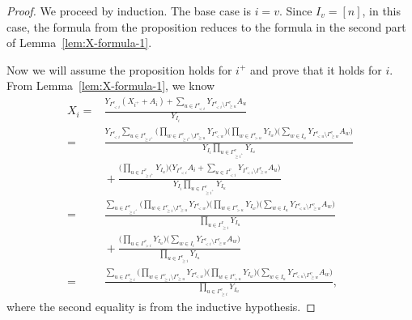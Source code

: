 \documentclass[pdftex]{sigma}
\numberwithin{equation}{section}
\begin{document}
\begin{proof}
We proceed by induction. The base case is $i=v$. Since $I_v=[n]$, in this case, the formula from the proposition reduces to the formula in the second part of Lemma~\ref{lem:X-formula-1}.

Now we will assume the proposition holds for $i^+$ and prove that it holds for $i$. From Lemma~\ref{lem:X-formula-1}, we know
\begin{align*}
X_i={} & \frac{Y_{\Gamma_{< i}^v}(X_{i^+}+A_i)+\sum_{u\in \Gamma_{< i}^v}Y_{\Gamma_{< i}^v\setminus\Gamma_{\geq u}^v}A_u}{Y_{I_i}}\\
={} & \frac{Y_{\Gamma_{< i}^v}\sum_{u\in\Gamma_{\geq i^+}^v}\Big(\prod_{w\in\Gamma_{\geq i^+}^v\setminus\Gamma_{\geq u}^v} Y_{\Gamma_{< w}^v}\Big)\Big(\prod_{w\in\Gamma_{> u}^v} Y_{I_w}\Big)\Big(\sum_{w\in I_u}Y_{\Gamma_{< u}^v\setminus\Gamma_{\geq w}^v}A_w\Big)}{Y_{I_i}\prod_{u\in\Gamma_{\geq i^+}^v}Y_{I_u}} \\
&{}+ \frac{\Big(\prod_{u\in\Gamma_{\geq i^+}^v}Y_{I_u}\Big)\Big(Y_{\Gamma_{< i}^v}A_i+\sum_{u\in \Gamma_{< i}^v}Y_{\Gamma_{< i}^v\setminus\Gamma_{\geq u}^v}A_u\Big)}{Y_{I_i}\prod_{u\in\Gamma_{\geq i^+}^v}Y_{I_u}}\\
={} & \frac{\sum_{u\in\Gamma_{\geq i^+}^v}\Big(\prod_{w\in\Gamma_{\geq i}^v\setminus\Gamma_{\geq u}^v} Y_{\Gamma_{< w}^v}\Big)\Big(\prod_{w\in\Gamma_{> u}^v} Y_{I_w}\Big)\Big(\sum_{w\in I_u}Y_{\Gamma_{< u}^v\setminus\Gamma_{\geq w}^v}A_w\Big)}{\prod_{u\in\Gamma_{\geq i}^v}Y_{I_u}} \\
&{}+ \frac{\Big(\prod_{u\in\Gamma_{> i}^v}Y_{I_u}\Big)\Big(\sum_{w\in I_i}Y_{\Gamma_{< i}^v\setminus\Gamma_{\geq w}^v}A_w\Big)}{\prod_{u\in\Gamma_{\geq i}^v}Y_{I_u}}\\
={} & \frac{\sum_{u\in\Gamma_{\geq i}^v}\Big(\prod_{w\in\Gamma_{\geq i}^v\setminus\Gamma_{\geq u}^v} Y_{\Gamma_{< w}^v}\Big)\Big(\prod_{w\in\Gamma_{> u}^v} Y_{I_w}\Big)\Big(\sum_{w\in I_u}Y_{\Gamma_{< u}^v\setminus\Gamma_{\geq w}^v}A_w\Big)}{\prod_{u\in\Gamma_{\geq i}^v}Y_{I_u}},
\end{align*}
where the second equality is from the inductive hypothesis.
\end{proof}
\end{document}
